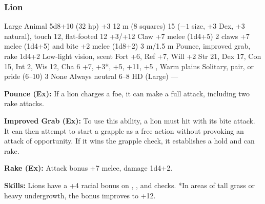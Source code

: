 \subsubsection{Lion}
\begin{MonsterStats}
{Large Animal}
{5d8+10 (32 hp)}
{+3}
{12 m (8 squares)}
{15 ($-1$ size, +3 Dex, +3 natural), touch 12, flat-footed 12}
{+3/+12}
{Claw +7 melee (1d4+5)}
{2 claws +7 melee (1d4+5) and bite +2 melee (1d8+2)}
{3 m/1.5 m}
{Pounce, improved grab, rake 1d4+2}
{Low-light vision, scent}
{Fort +6, Ref +7, Will +2}
{Str 21, Dex 17, Con 15, Int 2, Wis 12, Cha 6}
{ +7,  +3*,  +5,  +11,  +5}
{, }
{Warm plains}
{Solitary, pair, or pride (6--10)}
{3}
{None}
{Always neutral}
{6--8 HD (Large)}
{---}
\end{MonsterStats}

\textbf{Pounce (Ex):} If a lion charges a foe, it can make a full attack, including two rake attacks.

\textbf{Improved Grab (Ex):} To use this ability, a lion must hit with its bite attack. It can then attempt to start a grapple as a free action without provoking an attack of opportunity. If it wins the grapple check, it establishes a hold and can rake.

\textbf{Rake (Ex):} Attack bonus +7 melee, damage 1d4+2.

\textbf{Skills:} Lions have a +4 racial bonus on , , and  checks. *In areas of tall grass or heavy undergrowth, the  bonus improves to +12.

